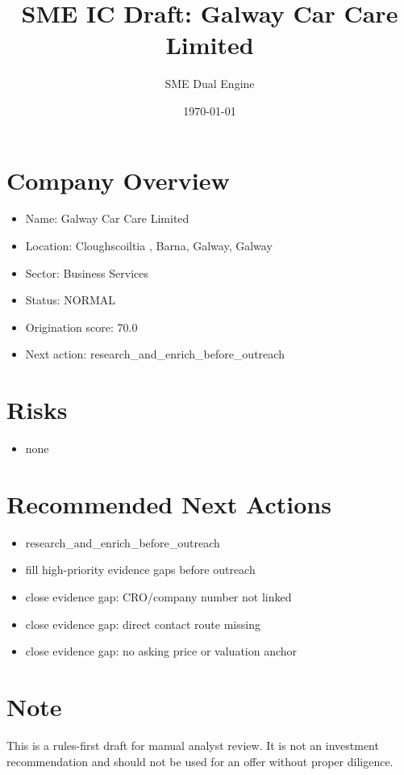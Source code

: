\documentclass[11pt,a4paper]{article}
\title{SME IC Draft: Galway Car Care Limited}
\author{SME Dual Engine}
\date{\today}
\begin{document}
\maketitle
\section*{Company Overview}
\begin{itemize}[leftmargin=1.4em]
\item Name: Galway Car Care Limited
\item Location: Cloughscoiltia , Barna, Galway, Galway
\item Sector: Business Services
\item Status: NORMAL
\item Origination score: 70.0
\item Next action: research\_and\_enrich\_before\_outreach
\end{itemize}
\section*{Risks}
\begin{itemize}[leftmargin=1.4em]
\item none
\end{itemize}
\section*{Recommended Next Actions}
\begin{itemize}[leftmargin=1.4em]
\item research\_and\_enrich\_before\_outreach
\item fill high-priority evidence gaps before outreach
\item close evidence gap: CRO/company number not linked
\item close evidence gap: direct contact route missing
\item close evidence gap: no asking price or valuation anchor
\end{itemize}
\section*{Note}
This is a rules-first draft for manual analyst review. It is not an investment
recommendation and should not be used for an offer without proper diligence.
\end{document}
